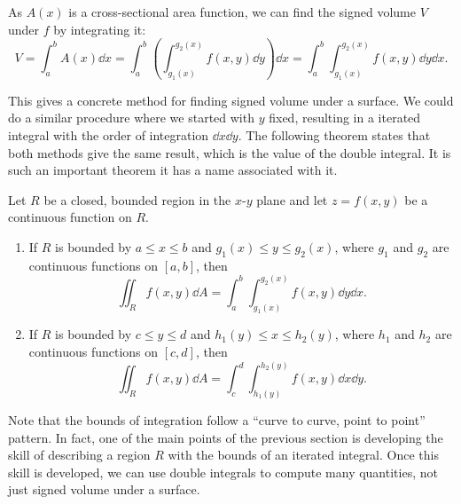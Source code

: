 
As $A(x)$ is a cross-sectional area function, we can find the signed volume $V$ under $f$ by integrating it:
\[
V = \int_a^b A(x)\dd x = \int_a^b\left(\int_{g_1(x)}^{g_2(x)} f(x,y)\dd y\right)\dd x
= \int_a^b\int_{g_1(x)}^{g_2(x)} f(x,y)\dd y\dd x.
\]

This gives a concrete method for finding signed volume under a surface. We could do a similar procedure where we started with $y$ fixed, resulting in a iterated integral with the order of integration $\dd x\dd y$. The following theorem states that both methods give the same result, which is the value of the double integral. It is such an important theorem it has a name associated with it.

\begin{theorem}\label{thm:fubini}
Let $R$ be a closed, bounded region in the $x$-$y$ plane and let $z=f(x,y)$ be a continuous function on $R$.%
\begin{enumerate}
	\item If $R$ is bounded by $a\leq x\leq b$ and $g_1(x)\leq y\leq g_2(x)$, where $g_1$ and $g_2$ are continuous functions on $[a,b]$, then
	\[\iint_R f(x,y)\dd A = \int_a^b\int_{g_1(x)}^{g_2(x)} f(x,y)\dd y\dd x.\]
	
	\item If $R$ is bounded by $c\leq y\leq d$ and $h_1(y)\leq x\leq h_2(y)$, where $h_1$ and $h_2$ are continuous functions on $[c,d]$, then
	\[\iint_R f(x,y)\dd A = \int_c^d\int_{h_1(y)}^{h_2(y)} f(x,y)\dd x\dd y.\]
\end{enumerate}
\end{theorem}

Note that the bounds of integration follow a ``curve to curve, point to point'' pattern. In fact, one of the main points of the previous section is developing the skill of describing a region $R$ with the bounds of an iterated integral. Once this skill is developed, we can use double integrals to compute many quantities, not just signed volume under a surface.

